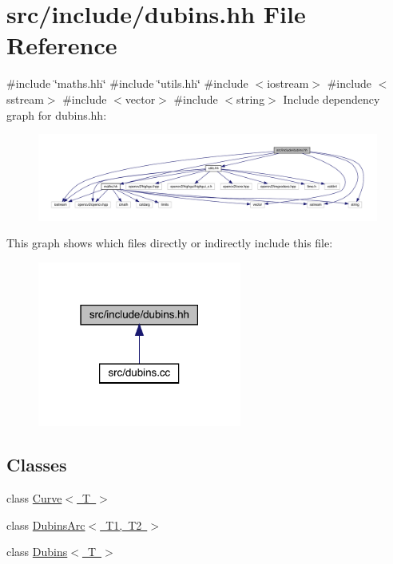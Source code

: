 \hypertarget{dubins_8hh}{}\section{src/include/dubins.hh File Reference}
\label{dubins_8hh}
{\ttfamily \#include \char`\"{}maths.\+hh\char`\"{}}\newline
{\ttfamily \#include \char`\"{}utils.\+hh\char`\"{}}\newline
{\ttfamily \#include $<$iostream$>$}\newline
{\ttfamily \#include $<$sstream$>$}\newline
{\ttfamily \#include $<$vector$>$}\newline
{\ttfamily \#include $<$string$>$}\newline
Include dependency graph for dubins.\+hh\+:
\nopagebreak
\begin{figure}[H]
\begin{center}
\leavevmode
\includegraphics[width=350pt]{dubins_8hh__incl}
\end{center}
\end{figure}
This graph shows which files directly or indirectly include this file\+:
\nopagebreak
\begin{figure}[H]
\begin{center}
\leavevmode
\includegraphics[width=190pt]{dubins_8hh__dep__incl}
\end{center}
\end{figure}
\subsection*{Classes}
\begin{DoxyCompactItemize}
\item 
class \mbox{\hyperlink{class_curve}{Curve$<$ T $>$}}
\item 
class \mbox{\hyperlink{class_dubins_arc}{Dubins\+Arc$<$ T1, T2 $>$}}
\item 
class \mbox{\hyperlink{class_dubins}{Dubins$<$ T $>$}}
\end{DoxyCompactItemize}
